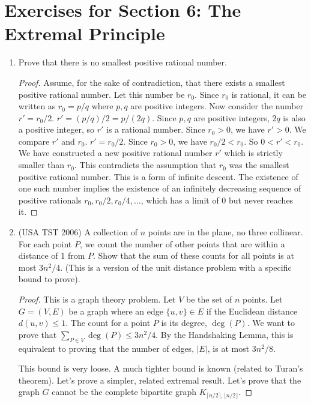 \section*{Exercises for Section 6: The Extremal Principle}
\begin{enumerate}
    \item {} Prove that there is no smallest positive rational number.
    \begin{proof}
    Assume, for the sake of contradiction, that there exists a smallest positive rational number. Let this number be $r_0$. Since $r_0$ is rational, it can be written as $r_0 = p/q$ where $p, q$ are positive integers.
    Now consider the number $r' = r_0 / 2$.
    $r' = (p/q)/2 = p/(2q)$. Since $p,q$ are positive integers, $2q$ is also a positive integer, so $r'$ is a rational number.
    Since $r_0 > 0$, we have $r' > 0$.
    We compare $r'$ and $r_0$. $r' = r_0/2$. Since $r_0 > 0$, we have $r_0/2 < r_0$. So $0 < r' < r_0$.
    We have constructed a new positive rational number $r'$ which is strictly smaller than $r_0$. This contradicts the assumption that $r_0$ was the smallest positive rational number.
    This is a form of infinite descent. The existence of one such number implies the existence of an infinitely decreasing sequence of positive rationals $r_0, r_0/2, r_0/4, \dots$, which has a limit of 0 but never reaches it.
    \end{proof}
    
    \item {} (USA TST 2006) A collection of $n$ points are in the plane, no three collinear. For each point $P$, we count the number of other points that are within a distance of 1 from $P$. Show that the sum of these counts for all points is at most $3n^2/4$. (This is a version of the unit distance problem with a specific bound to prove).
    \begin{proof}
    This is a graph theory problem. Let $V$ be the set of $n$ points. Let $G=(V,E)$ be a graph where an edge $\{u,v\} \in E$ if the Euclidean distance $d(u,v) \le 1$. The count for a point $P$ is its degree, $\deg(P)$. We want to prove that $\sum_{P \in V} \deg(P) \le 3n^2/4$. By the Handshaking Lemma, this is equivalent to proving that the number of edges, $|E|$, is at most $3n^2/8$.
    
    This bound is very loose. A much tighter bound is known (related to Turan's theorem). Let's prove a simpler, related extremal result.
    Let's prove that the graph $G$ cannot be the complete bipartite graph $K_{\lceil n/2 \rceil, \lfloor n/2 \rfloor}$.
    

\end{proof}
\end{enumerate}
